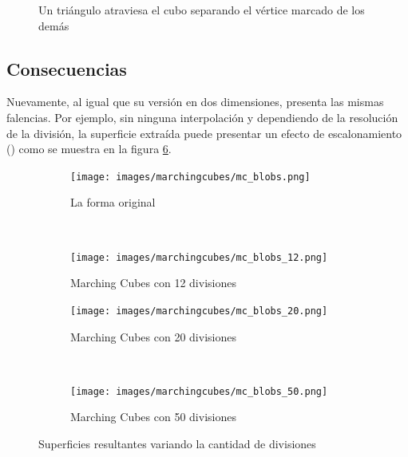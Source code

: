 \begin{figure}[ht]
\centering
\caption{Un triángulo atraviesa el cubo separando el vértice marcado de los demás}
\label{f:estadoDelArte:cube_03}
\end{figure}

\subsection{Consecuencias}
\label{subsec:marchingCubes:consecuencias}

Nuevamente, al igual que su versión en dos dimensiones, presenta las mismas falencias.
Por ejemplo, sin ninguna interpolación y dependiendo de la resolución de la división, la
superficie extraída puede presentar un efecto de escalonamiento () como se
muestra en la figura \ref{f:estadoDelArte:superficies_resultantes_variando_divisiones}.

\begin{figure}

	\begin{subfigure}{0.45\textwidth}
		\centering
		\texttt{[image: images/marchingcubes/mc\_blobs.png]}
		\caption{La forma original}
		\label{f:estadoDelArte:mc_blobs}
	\end{subfigure}
	~
	\begin{subfigure}{0.45\textwidth}
		\centering
		\texttt{[image: images/marchingcubes/mc\_blobs\_12.png]}
		\caption{Marching Cubes con 12 divisiones}
		\label{f:estadoDelArte:mc_blobs_12}
	\end{subfigure}

	\begin{subfigure}{0.45\textwidth}
		\centering
		\texttt{[image: images/marchingcubes/mc\_blobs\_20.png]}
		\caption{Marching Cubes con 20 divisiones}
		\label{f:estadoDelArte:mc_blobs_20}
	\end{subfigure}
	~
	\begin{subfigure}{0.45\textwidth}
		\centering
		\texttt{[image: images/marchingcubes/mc\_blobs\_50.png]}
		\caption{Marching Cubes con 50 divisiones}
		\label{f:estadoDelArte:mc_blobs_50}
	\end{subfigure}

	\caption{Superficies resultantes variando la cantidad de divisiones}
	\label{f:estadoDelArte:superficies_resultantes_variando_divisiones}
\end{figure}


